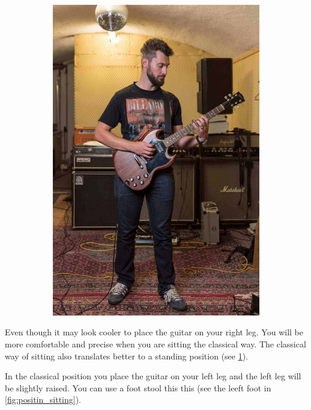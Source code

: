 \begin{figure}[h]
\begin{subfigure}[b]{0.45\textwidth}
    \includegraphics[width=\textwidth]{image/Letty_Guitar-Shooting_standing.jpg}
    \caption{}
    \label{fig:positin_standing}
  \end{subfigure}
  \caption{\cite{SitStandPosition}}
  \label{fig:positin}
\end{figure}


Even though it may look cooler to place the guitar on your right leg. You will be more comfortable and precise when you are sitting the classical way. The classical way of sitting also translates better to a standing position (see \ref{fig:positin_standing}).

In the classical position you place the guitar on your left leg and the left leg will be slightly raised. You can use a foot stool this this (see the leeft foot in \ref{fig:positin_sitting}).